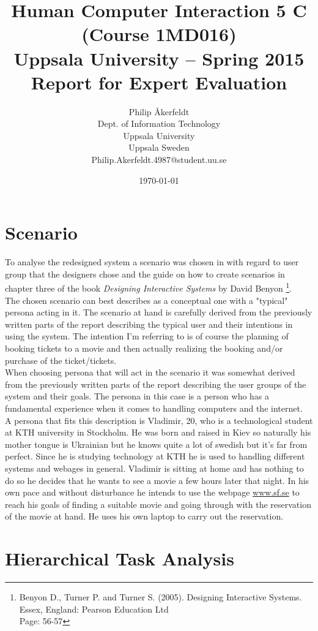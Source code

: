 \documentclass[a4paper,11pt]{article}
\title{\textbf{Human Computer Interaction 5 C (Course 1MD016) \\
    Uppsala University -- Spring 2015 \\
    Report for Expert Evaluation}}
\author{
Philip \AA kerfeldt\\
\textup{Dept. of Information Technology}\\
\textup{Uppsala University}\\
\textup{Uppsala Sweden}\\
\textup{Philip.Akerfeldt.4987@student.uu.se}
}
\date{\today}
\begin{document}
\maketitle
\newpage
\tableofcontents
\pagebreak


\section{Scenario}
To analyse the redesigned system a scenario was chosen in with regard to user group that the designers chose and the guide on how to create scenarios in chapter three of the book \textit{Designing Interactive Systems} by David Benyon \footnote{Benyon D., Turner P. and Turner S. (2005). Designing Interactive Systems. Essex, England: Pearson Education Ltd \\
Page: 56-57}.\\ 
The chosen scenario can best describes as a conceptual one with a "typical" persona acting in it. The scenario at hand is carefully derived from the previously written parts of the report describing the typical user and their intentions in using the system. The intention I'm referring to is of course the planning of booking tickets to a movie and then actually realizing the booking and/or purchase of the ticket/tickets.\\

When choosing persona that will act in the scenario it was somewhat derived from the previously written parts of the report describing the user groups of the system and their goals. The persona in this case is a person who has a fundamental experience when it comes to handling computers and the internet. \\
A persona that fits this description is Vladimir, 20, who is a technological student at KTH university in Stockholm. He was born and raised in Kiev so naturally his mother tongue is Ukrainian but he knows quite a lot of swedish but it's far from perfect. Since he is studying technology at KTH he is used to handling different systems and webages in general. Vladimir is sitting at home and has nothing to do so he decides that he wants to see a movie a few hours later that night. In his own pace and without disturbance he intends to use the webpage \url{www.sf.se} to reach his goals of finding a suitable movie and going through with the reservation of the movie at hand. He uses his own laptop to carry out the reservation. \\    
		

\section{Hierarchical Task Analysis}
\end{document}
